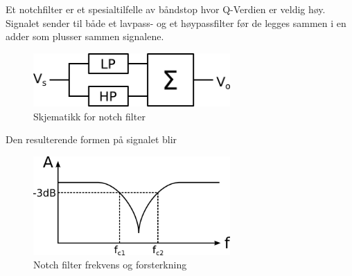Et notchfilter er et spesialtilfelle av båndstop hvor Q-Verdien er veldig høy.
Signalet sender til både et lavpass- og et høypassfilter før de legges sammen
i en adder som plusser sammen signalene.

\begin{figure}[H]
  \caption{Skjematikk for notch filter}
  \centering
  \includegraphics[width=0.67\textwidth]{./img/notch-kobling}
\end{figure}

Den resulterende formen på signalet blir

\begin{figure}[H]
  \caption{Notch filter frekvens og forsterkning}
  \centering
  \includegraphics[width=0.67\textwidth]{./img/notch-frekvens}
\end{figure}
